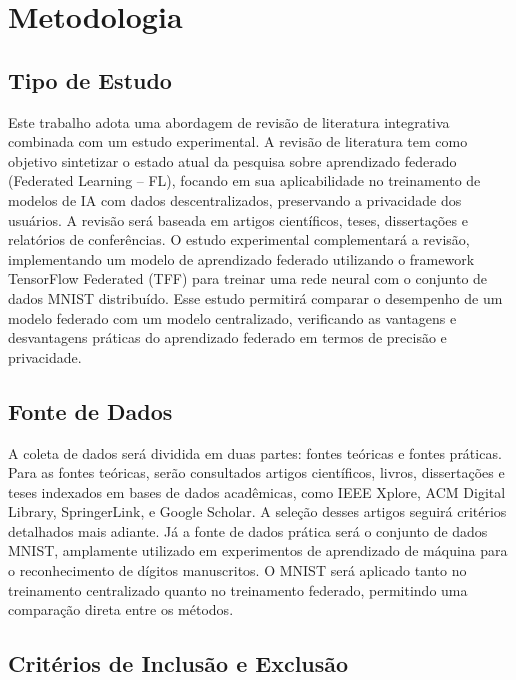 \chapter[Metodologia]{Metodologia}
\label{chap:metodologia}

\section{Tipo de Estudo}

Este trabalho adota uma abordagem de revisão de literatura integrativa combinada com um estudo experimental. A revisão de literatura tem como objetivo sintetizar o estado atual da pesquisa sobre aprendizado federado (Federated Learning – FL), focando em sua aplicabilidade no treinamento de modelos de IA com dados descentralizados, preservando a privacidade dos usuários. A revisão será baseada em artigos científicos, teses, dissertações e relatórios de conferências. O estudo experimental complementará a revisão, implementando um modelo de aprendizado federado utilizando o framework TensorFlow Federated (TFF) para treinar uma rede neural com o conjunto de dados MNIST distribuído. Esse estudo permitirá comparar o desempenho de um modelo federado com um modelo centralizado, verificando as vantagens e desvantagens práticas do aprendizado federado em termos de precisão e privacidade.

\section{Fonte de Dados}

A coleta de dados será dividida em duas partes: fontes teóricas e fontes práticas. Para as fontes teóricas, serão consultados artigos científicos, livros, dissertações e teses indexados em bases de dados acadêmicas, como IEEE Xplore, ACM Digital Library, SpringerLink, e Google Scholar. A seleção desses artigos seguirá critérios detalhados mais adiante. Já a fonte de dados prática será o conjunto de dados MNIST, amplamente utilizado em experimentos de aprendizado de máquina para o reconhecimento de dígitos manuscritos. O MNIST será aplicado tanto no treinamento centralizado quanto no treinamento federado, permitindo uma comparação direta entre os métodos.

\section{Critérios de Inclusão e Exclusão}

